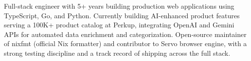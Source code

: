 

\begin{cvparagraph}

Full-stack engineer with 5+ years building production web applications using TypeScript, Go, and Python.
Currently building AI-enhanced product features serving a 100K+ product catalog at Perkup, integrating OpenAI and Gemini APIs for automated data enrichment and categorization.
Open-source maintainer of nixfmt (official Nix formatter) and contributor to Servo browser engine, with a strong testing discipline and a track record of shipping across the full stack.

\end{cvparagraph}
